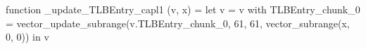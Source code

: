 function _update_TLBEntry_capl1 (v, x) = let v = { v with TLBEntry_chunk_0 = vector_update_subrange(v.TLBEntry_chunk_0, 61, 61, vector_subrange(x, 0, 0)) } in v
